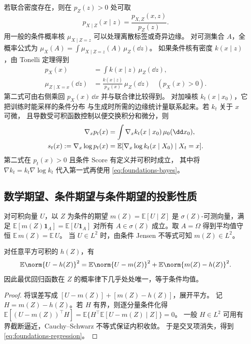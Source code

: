 若联合密度存在，则在 \(p_Z(z)>0\) 处可取
\[
  p_{X\mid Z}(x\mid z)=\frac{p_{X,Z}(x,z)}{p_Z(z)}.
\]
用一般的条件概率核 \(\mu_{X\mid Z=z}\) 可以处理离散标签或奇异边缘。
对可测集合 \(A\)，全概率公式为
\(\mu_X(A)=\int\mu_{X\mid Z=z}(A)\,\mu_Z(\dd z)\)。
如果条件核有密度 \(k(x\mid z)\)，由 Tonelli 定理得到
\begin{equation}
  \begin{aligned}
    p_X(x)&=\int k(x\mid z)\,\mu_Z(\dd z),\\
    \mu_{Z\mid X=x}(\dd z)&=\frac{k(x\mid z)}{p_X(x)}\,\mu_Z(\dd z)
      \quad (p_X(x)>0).
  \end{aligned}
  \label{eq:foundations-bayes}
\end{equation}
第二式可由右侧乘回 \(p_X(x)\,\dd x\) 并与联合律比较得到。
对加噪核 \(k_t(x\mid x_0)\)，它把训练时能采样的条件分布
与生成时所需的边缘统计量联系起来。若 \(k_t\) 关于 \(x\) 可微，
且导数受可积函数控制以便交换积分和微分，则
\begin{align}
  \nabla_x p_t(x)
    &=\int \nabla_x k_t(x\mid x_0)\,\mu_0(\dd x_0), \notag\\
  s_t(x):=\nabla_x\log p_t(x)
    &=\mathbb E[\nabla_x\log k_t(x\mid X_0)\mid X_t=x].
    \label{eq:foundations-score-identity}
\end{align}
第二式在 \(p_t(x)>0\) 且条件 Score 有定义并可积时成立，
其中将 \(\nabla k_t=k_t\nabla\log k_t\) 代入第一式再使用
\eqref{eq:foundations-bayes}。

\subsection{数学期望、条件期望与条件期望的投影性质\requiredderivation}

对可积向量 \(U\)，以 \(Z\) 为条件的期望 \(m(Z)=\mathbb E[U\mid Z]\)
是 \(\sigma(Z)\)-可测向量，满足
\(\mathbb E[m(Z)\mathbf 1_A]=\mathbb E[U\mathbf 1_A]\)
对所有 \(A\in\sigma(Z)\) 成立。取 \(A=\Omega\) 得到平均值守恒
\(\mathbb E\,m(Z)=\mathbb E\,U\)。
当 \(U\in L^2\) 时，由条件 Jensen 不等式可知 \(m(Z)\in L^2\)。

\begin{proposition}[条件均值最小化均方误差]
对任意平方可积的 \(h(Z)\)，有
\begin{equation}
  \mathbb E\norm{U-h(Z)}^2
    =\mathbb E\norm{U-m(Z)}^2
      +\mathbb E\norm{m(Z)-h(Z)}^2.
  \label{eq:foundations-regression}
\end{equation}
因此最优回归函数在 \(Z\) 的概率律下几乎处处唯一，等于条件均值。
\end{proposition}
\begin{proof}
将误差写成 \([U-m(Z)]+[m(Z)-h(Z)]\)，展开平方。
记 \(H=m(Z)-h(Z)\)。若 \(H\) 有界，则逐分量条件化得
\(\mathbb E[(U-m(Z))^\top H]
=\mathbb E\{H^\top\mathbb E[U-m(Z)\mid Z]\}=0\)。
一般 \(H\in L^2\) 可用有界截断逼近，Cauchy--Schwarz 不等式保证内积收敛。
于是交叉项消失，得到 \eqref{eq:foundations-regression}。
\end{proof}

